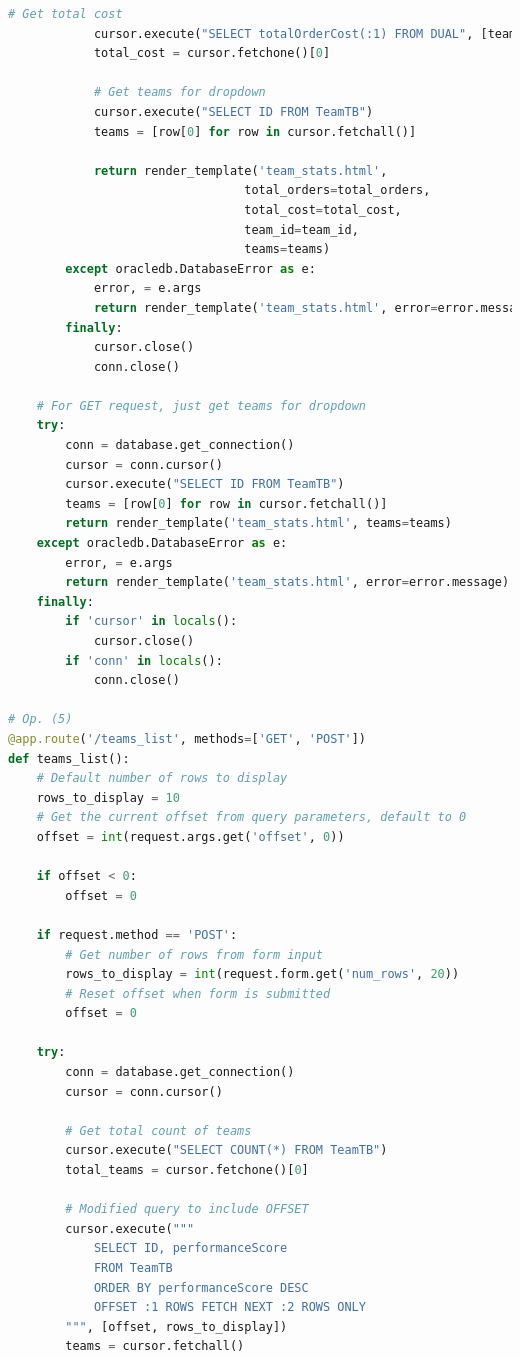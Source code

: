 \begin{lstlisting}[language=python]
            # Get total cost
            cursor.execute("SELECT totalOrderCost(:1) FROM DUAL", [team_id])
            total_cost = cursor.fetchone()[0]
            
            # Get teams for dropdown
            cursor.execute("SELECT ID FROM TeamTB")
            teams = [row[0] for row in cursor.fetchall()]
            
            return render_template('team_stats.html', 
                                 total_orders=total_orders,
                                 total_cost=total_cost,
                                 team_id=team_id,
                                 teams=teams)
        except oracledb.DatabaseError as e:
            error, = e.args
            return render_template('team_stats.html', error=error.message)
        finally:
            cursor.close()
            conn.close()
    
    # For GET request, just get teams for dropdown
    try:
        conn = database.get_connection()
        cursor = conn.cursor()
        cursor.execute("SELECT ID FROM TeamTB")
        teams = [row[0] for row in cursor.fetchall()]
        return render_template('team_stats.html', teams=teams)
    except oracledb.DatabaseError as e:
        error, = e.args
        return render_template('team_stats.html', error=error.message)
    finally:
        if 'cursor' in locals():
            cursor.close()
        if 'conn' in locals():
            conn.close()

# Op. (5)
@app.route('/teams_list', methods=['GET', 'POST'])
def teams_list():
    # Default number of rows to display
    rows_to_display = 10
    # Get the current offset from query parameters, default to 0
    offset = int(request.args.get('offset', 0))
    
    if offset < 0:
        offset = 0
    
    if request.method == 'POST':
        # Get number of rows from form input
        rows_to_display = int(request.form.get('num_rows', 20))
        # Reset offset when form is submitted
        offset = 0

    try:
        conn = database.get_connection()
        cursor = conn.cursor()
        
        # Get total count of teams
        cursor.execute("SELECT COUNT(*) FROM TeamTB")
        total_teams = cursor.fetchone()[0]
        
        # Modified query to include OFFSET
        cursor.execute("""
            SELECT ID, performanceScore 
            FROM TeamTB 
            ORDER BY performanceScore DESC
            OFFSET :1 ROWS FETCH NEXT :2 ROWS ONLY
        """, [offset, rows_to_display])
        teams = cursor.fetchall()
        

\end{lstlisting}
